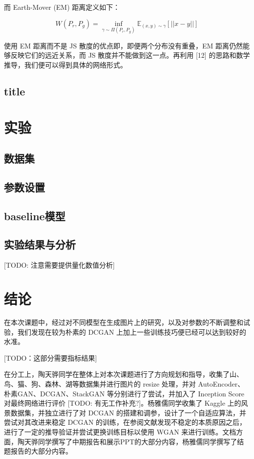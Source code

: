 \documentclass{article}
\begin{document}
\begin{CJK*}{UTF8}{gbsn}
	而 Earth-Mover (EM) 距离定义如下：
	
	\begin{equation}
	  W(P_r, P_g) = \inf_{\gamma \sim \Pi(P_r, P_g)} \mathbb{E}_{(x, y) \sim \gamma}[||x-y||]
	\end{equation}
	
	使用 EM 距离而不是 JS 散度的优点即，即便两个分布没有重叠，EM 距离仍然能够反映它们的远近关系，而 JS 散度并不能做到这一点。再利用 [12] 的思路和数学推导，我们便可以得到具体的网络形式。
	
  \subsection{title}



  

\section{实验}

  \subsection{数据集}

  \subsection{参数设置}

  \subsection{baseline模型}

  \subsection{实验结果与分析}

  [TODO: 注意需要提供量化数值分析]

\section{结论}

在本次课题中，经过对不同模型在生成图片上的研究，以及对参数的不断调整和试验，我们发现在较为朴素的 DCGAN 上加上一些训练技巧便已经可以达到较好的水准。

[TODO：这部分需要指标结果]

  在分工上，陶天骅同学在整体上对本次课题进行了方向规划和指导，收集了山、鸟、猫、狗、森林、湖等数据集并进行图片的 resize 处理，并对 AutoEncoder、朴素GAN、DCGAN、StackGAN 等分别进行了尝试，并加入了 Inception Score 对最终网络进行评价 [TODO: 有无工作补充?]。杨雅儒同学收集了 Kaggle 上的风景数据集，并独立进行了对 DCGAN 的搭建和调参，设计了一个自适应算法，并尝试对其改进来稳定 DCGAN 的训练，在参阅文献发现不稳定的本质原因之后，进行了一定的推导验证并尝试更换训练目标以使用 WGAN 来进行训练。文档方面，陶天骅同学撰写了中期报告和展示PPT的大部分内容，杨雅儒同学撰写了结题报告的大部分内容。


\end{CJK*}
\end{document}
